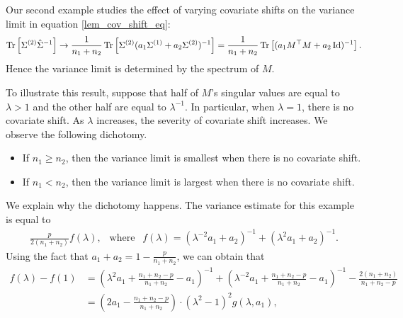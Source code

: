 \begin{example}\label{ex_covshift}
Our second example studies the effect of varying covariate shifts on the variance limit in equation \eqref{lem_cov_shift_eq}:
	\[ \operatorname{Tr}\left[\Sigma^{(2)} \hat{\Sigma}^{-1}\right] \rightarrow \frac{1}{n_1 + n_2} \operatorname{Tr}\left[\Sigma^{(2)} (a_1 \Sigma^{(1)} + a_2 \Sigma^{(2)})^{-1}\right]= \frac{1}{n_1 + n_2} \operatorname{Tr}\left[(a_1 M^{\top} M + a_2 \operatorname{Id})^{-1}\right]. \]
Hence the variance limit is determined by the spectrum of $M$.

To illustrate this result, suppose that half of $M$'s singular values are equal to $\lambda > 1$ and the other half are equal to $\lambda^{-1}$.
In particular, when $\lambda = 1$, there is no covariate shift.
As $\lambda$ increases, the severity of covariate shift increases.
We observe the following dichotomy.
\begin{itemize}
	\item If $n_1 \ge n_2$, then the variance limit is smallest when there is no covariate shift.
	\item If $n_1 < n_2$, then the variance limit is largest when there is no covariate shift.
\end{itemize}
\end{example}
We explain why the dichotomy happens. The variance estimate for this example is equal to
\begin{align*}
	\frac{p}{2(n_1 + n_2)} f(\lambda), \ \ \text{ where }\ \  f(\lambda) = {(\lambda^{-2} a_1 + a_2)^{-1} + (\lambda^2 a_1 + a_2)^{-1}}.
\end{align*}
Using the fact that $a_1 + a_2 = 1 - \frac{p}{n_1 + n_2 }$, we can obtain that
\begin{align*}
	f(\lambda) - f(1) &= \left(\lambda^2 a_1 + \frac{n_1 + n_2 - p}{n_1 + n_2} - a_1\right)^{-1}
	+ \left(\lambda^{-2} a_1 + \frac{n_1 + n_2 - p}{n_1 + n_2} - a_1\right)^{-1}  - \frac{2(n_1 + n_2)}{n_1 + n_2 - p} \\
	&= \left(2a_1 - \frac{n_1 + n_2-p} {n_1 + n_2 }\right)\cdot (\lambda^2-1)^2  g(\lambda, a_1),
\end{align*}
